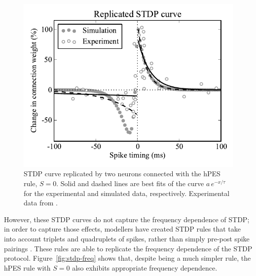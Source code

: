 \documentclass[10pt,letterpaper]{article}
\begin{document}
\begin{figure}[ht]
\begin{center}
\includegraphics[width=\columnwidth]{fig1-bcm-stdp}
\end{center}
\caption{STDP curve replicated by two neurons
  connected with the hPES rule, $S = 0$.
  Solid and dashed lines are best fits of the curve
  $a\,e^{-x / \tau}$ for the experimental
  and simulated data, respectively.
  Experimental data from \cite{Bi2001}.}
\label{fig:stdp-curve}
\end{figure}

However, these STDP curves do not capture
the frequency dependence of STDP;
in order to capture those effects,
modellers have created STDP rules that take into
account triplets and quadruplets of spikes,
rather than simply pre-post spike pairings \cite{Pfister2006}.
These rules are able to replicate
the frequency dependence of the STDP protocol.
Figure~\ref{fig:stdp-freq} shows that,
despite being a much simpler rule,
the hPES rule with $S = 0$
also exhibits appropriate frequency dependence.
\end{document}
